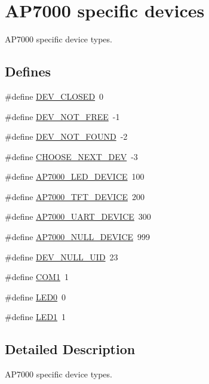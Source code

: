 \hypertarget{group___a_p7000___d_e_v}{
\section{AP7000 specific devices}
\label{group___a_p7000___d_e_v}
}
AP7000 specific device types.  


\subsection*{Defines}
\begin{CompactItemize}
\item 
\#define \hyperlink{group___a_p7000___d_e_v_gcc57cb6b21940d6081f11ccda4a6edeb}{DEV\_\-CLOSED}~0
\item 
\#define \hyperlink{group___a_p7000___d_e_v_g1efcb51e9cd98aa0cf1f968a98330cd2}{DEV\_\-NOT\_\-FREE}~-1
\item 
\#define \hyperlink{group___a_p7000___d_e_v_geb725262e4a6b9035c8194b0fb3dee69}{DEV\_\-NOT\_\-FOUND}~-2
\item 
\#define \hyperlink{group___a_p7000___d_e_v_g806716f897cab5cd19b55deb3ba7c53b}{CHOOSE\_\-NEXT\_\-DEV}~-3
\item 
\#define \hyperlink{group___a_p7000___d_e_v_g065b4e419d65dbf6c53e09055056f3ba}{AP7000\_\-LED\_\-DEVICE}~100
\item 
\#define \hyperlink{group___a_p7000___d_e_v_gcee8aa4103d694c10d1b908a6983c051}{AP7000\_\-TFT\_\-DEVICE}~200
\item 
\#define \hyperlink{group___a_p7000___d_e_v_g5a7c086eb68e737d93168b6dbcde7d0d}{AP7000\_\-UART\_\-DEVICE}~300
\item 
\#define \hyperlink{group___a_p7000___d_e_v_gf7417306a0bc7584c3b90c7e842dfa7d}{AP7000\_\-NULL\_\-DEVICE}~999
\item 
\#define \hyperlink{group___a_p7000___d_e_v_g9f048df36bf3e7d560e5f81114a11ec0}{DEV\_\-NULL\_\-UID}~23
\item 
\#define \hyperlink{group___a_p7000___d_e_v_g00dbb3ab1c59e14699be9393693e2248}{COM1}~1
\item 
\#define \hyperlink{group___a_p7000___d_e_v_ge8d5b4e7e2d9d21caaa4744d385d7cc7}{LED0}~0
\item 
\#define \hyperlink{group___a_p7000___d_e_v_g8aa85ae9867fabf70ec72cd3bf6fb6b9}{LED1}~1
\end{CompactItemize}


\subsection{Detailed Description}
AP7000 specific device types. 


